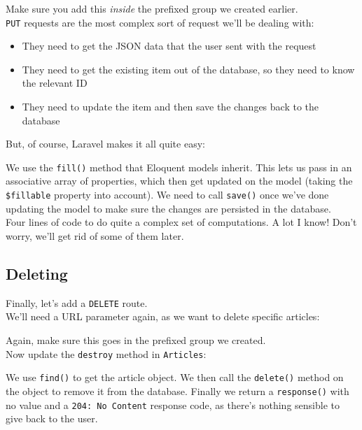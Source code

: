 
Make sure you add this \textit{inside} the prefixed group we created earlier.
\\

\texttt{PUT} requests are the most complex sort of request we'll be dealing with:

\begin{itemize}
    \item They need to get the JSON data that the user sent with the request
    \item They need to get the existing item out of the database, so they need to know the relevant ID
    \item They need to update the item and then save the changes back to the database
\end{itemize}

But, of course, Laravel makes it all quite easy:


We use the \texttt{fill()} method that Eloquent models inherit. This lets us pass in an associative array of properties, which then get updated on the model (taking the \texttt{\$fillable} property into account). We need to call \texttt{save()} once we've done updating the model to make sure the changes are persisted in the database.
\\

Four lines of code to do quite a complex set of computations. A lot I know! Don't worry, we'll get rid of some of them later.


\subsection{Deleting}

Finally, let's add a \texttt{DELETE} route.
\\

We'll need a URL parameter again, as we want to delete specific articles:


Again, make sure this goes in the prefixed group we created.
\\

Now update the \texttt{destroy} method in \texttt{Articles}:


We use \texttt{find()} to get the article object. We then call the \texttt{delete()} method on the object to remove it from the database. Finally we return a \texttt{response()} with no value and a \texttt{204: No Content} response code, as there's nothing sensible to give back to the user.

